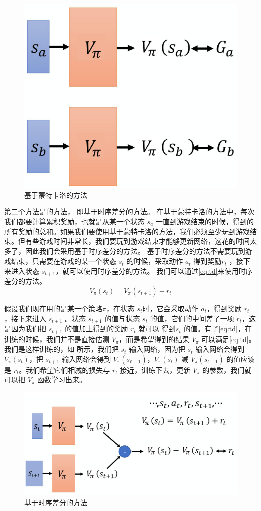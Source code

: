\begin{figure}[hbt]
    \centering
    \includegraphics[width=0.3\linewidth]{res/ch6/6.2}
    \caption{基于蒙特卡洛的方法}
    \label{fig:fig6.2}
\end{figure}

第二个方法是的方法， 即基于时序差分的方法。
在基于蒙特卡洛的方法中，每次我们都要计算累积奖励，也就是从某一个状态 $s_a$ 一直到游戏结束的时候，得到的所有奖励的总和。如果我们要使用基于蒙特卡洛的方法，我们必须至少玩到游戏结束。但有些游戏时间非常长，我们要玩到游戏结束才能够更新网络，这花的时间太多了，因此我们会采用基于时序差分的方法。
基于时序差分的方法不需要玩到游戏结束，只需要在游戏的某一个状态 $s_t$ 的时候，采取动作 $a_t$ 得到奖励$r_t$ ，接下来进入状态 $s_{t+1}$，就可以使用时序差分的方法。
我们可以通过\eqref{eq:td}来使用时序差分的方法。
\begin{equation}
    \label{eq:td}
    V_{\pi}\left(s_{t}\right)=V_{\pi}\left(s_{t+1}\right)+r_{t}
\end{equation}

假设我们现在用的是某一个策略$\pi$，在状态 $s_t$时，它会采取动作 $a_t$，得到奖励 $r_t$ ，接下来进入 $s_{t+1}$ 。状态 $s_{t+1}$ 的值与状态 $s_t$ 的值，它们的中间差了一项 $r_t$，这是因为我们把 $s_{t+1}$ 的值加上得到的奖励 $r_t$ 就可以 得到$s_t$ 的值。有了\eqref{eq:td}，在训练的时候，我们并不是直接估测 $V_{\pi}$，而是希望得到的结果 $V_{\pi}$ 可以满足\eqref{eq:td}。
我们是这样训练的，如 所示，我们把 $s_t$ 输入网络，因为把 $s_t$ 输入网络会得到 $V_{\pi}(s_t)$，把 $s_{t+1}$ 输入网络会得到 $V_{\pi}(s_{t+1})$，$V_{\pi}(s_t)$ 减 $V_{\pi}(s_{t+1})$ 的值应该是 $r_t$。我们希望它们相减的损失与 $r_t$ 接近，训练下去，更新 $V_{\pi}$ 的参数，我们就可以把 $V_{\pi}$ 函数学习出来。

\begin{figure}[hbt]
    \centering
    \includegraphics[width=0.5\linewidth]{res/ch6/6.3}
    \caption{基于时序差分的方法}
    \label{fig:fig6.3}
\end{figure}

